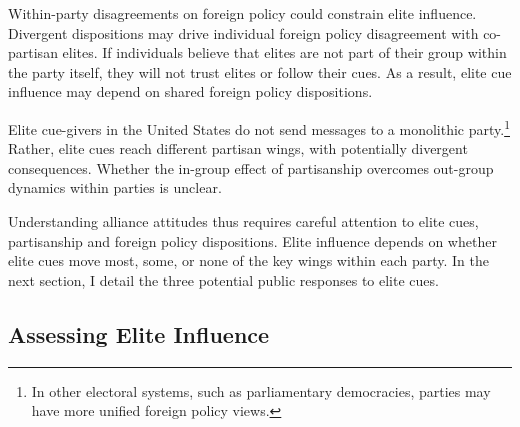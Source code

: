 \documentclass[12pt]{article}
\begin{document}


Within-party disagreements on foreign policy could constrain elite influence. 
Divergent dispositions may drive individual foreign policy disagreement with co-partisan elites.
If individuals believe that elites are not part of their group within the party itself, they will not trust elites or follow their cues. 
As a result, elite cue influence may depend on shared foreign policy dispositions.


Elite cue-givers in the United States do not send messages to a monolithic party.\footnote{In other electoral systems, such as parliamentary democracies, parties may have more unified foreign policy views.}
Rather, elite cues reach different partisan wings, with potentially divergent consequences. 
Whether the in-group effect of partisanship overcomes out-group dynamics within parties is unclear. 


Understanding alliance attitudes thus requires careful attention to elite cues, partisanship and foreign policy dispositions. 
Elite influence depends on whether elite cues move most, some, or none of the key wings within each party. 
In the next section, I detail the three potential public responses to elite cues. 






\subsection{Assessing Elite Influence}
\end{document}
